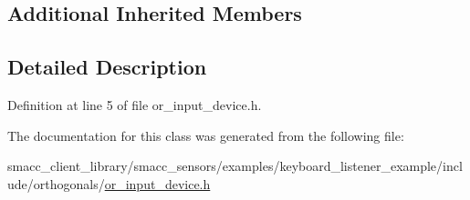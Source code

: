 \subsection*{Additional Inherited Members}


\subsection{Detailed Description}


Definition at line 5 of file or\+\_\+input\+\_\+device.\+h.



The documentation for this class was generated from the following file\+:\begin{DoxyCompactItemize}
\item 
smacc\+\_\+client\+\_\+library/smacc\+\_\+sensors/examples/keyboard\+\_\+listener\+\_\+example/include/orthogonals/\hyperlink{or__input__device_8h}{or\+\_\+input\+\_\+device.\+h}\end{DoxyCompactItemize}
